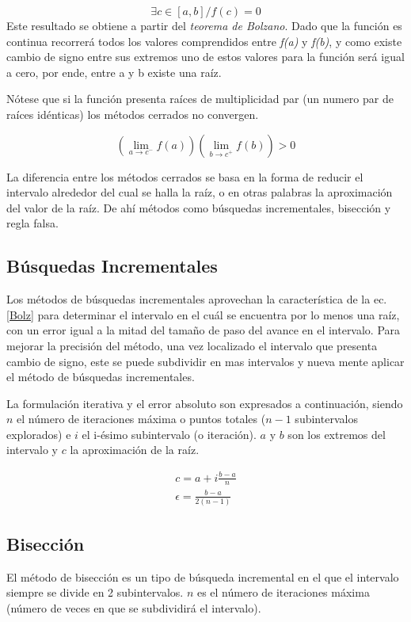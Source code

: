 \documentclass[letterpaper,10pt,oneside]{sphinxmanual}
\theoremstyle{plain}%
\theoremstyle{definition}%
\theoremstyle{remark}%
\begin{document}
\[ \exists c \in \left[ a,b \right]/f(c)=0 \]
Este resultado se obtiene a partir del \textit{teorema de Bolzano}. Dado que la función es continua
recorrerá todos los valores comprendidos entre \textit{f(a)} y \textit{f(b)}, y como existe cambio de signo
entre sus extremos uno de estos valores para la función será igual a cero, por ende, entre a y b
existe una raíz.\medskip

\noindent Nótese que si la función presenta raíces de multiplicidad par (un numero par de raíces
idénticas) los métodos cerrados no convergen.\medskip

\[ \left(\lim_{a \to c^{-}}f(a)\right)\left(\lim_{b \to c^{+}}f(b)\right)> 0  \]

\noindent La diferencia entre los métodos cerrados se basa en la forma de reducir el intervalo alrededor
del cual se halla la raíz, o en otras palabras la aproximación del valor de la raíz. De ahí métodos
como búsquedas incrementales, bisección y regla falsa.\noindent

\subsection{Búsquedas Incrementales}
\label{chapter02:Búsquedas Incrementales}

\noindent Los métodos de búsquedas incrementales aprovechan la característica de la ec.\ref{Bolz} para determinar el intervalo en el cuál se encuentra por lo menos una raíz, con un error igual a la mitad del tamaño de paso del avance en el intervalo. Para mejorar la precisión del método, una vez localizado el intervalo que presenta cambio de signo, este se puede subdividir en mas intervalos y nueva mente aplicar el método de búsquedas incrementales.\medskip

\noindent La formulación iterativa y el error absoluto son expresados a continuación, siendo $n$ el número de iteraciones máxima o puntos totales ($n-1$ subintervalos explorados) e $i$ el i-ésimo subintervalo (o iteración). $a$ y $b$ son los extremos del intervalo y $c$ la aproximación de la raíz.\medskip

\begin{eqnarray}
 c=a+i\frac{b-a}{n} \label{bincr}\\
 \epsilon = \frac{b-a}{2(n-1)} \nonumber
\end{eqnarray}

\subsection{Bisección}
\noindent El método de bisección es un tipo de búsqueda incremental en el que el intervalo siempre se divide en 2 subintervalos. $n$ es el número de iteraciones máxima (número de veces en que se subdividirá el intervalo).\medskip
\end{document}
